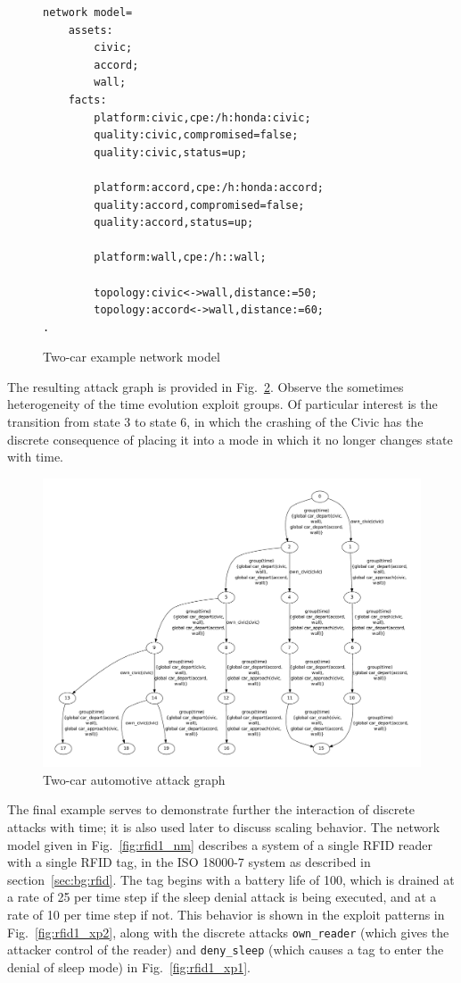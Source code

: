 \begin{figure}
\begin{lstlisting}
network model=
    assets:
        civic;
        accord;
        wall;
    facts:
        platform:civic,cpe:/h:honda:civic;
        quality:civic,compromised=false;
        quality:civic,status=up;
        
        platform:accord,cpe:/h:honda:accord;
        quality:accord,compromised=false;
        quality:accord,status=up;

        platform:wall,cpe:/h::wall;

        topology:civic<->wall,distance:=50;
        topology:accord<->wall,distance:=60;
.
\end{lstlisting}
\caption{Two-car example network model}
\label{fig:fullbunny_two_nm}
\end{figure}

The resulting attack graph is provided in Fig.~\ref{fig:fullbunny_two_ag}.
Observe the sometimes heterogeneity of the time evolution exploit groups.
Of particular interest is the transition from state 3 to state 6, in which
the crashing of the Civic has the discrete consequence of placing it into a
mode in which it no longer changes state with time.

\begin{figure}
\includegraphics[width=6in]{ag_car/twocar/full_bunny_twocar_ag_5}
\caption{Two-car automotive attack graph}
\label{fig:fullbunny_two_ag}
\end{figure}
The final example serves to demonstrate further the interaction of discrete
attacks with time; it is also used later to discuss scaling behavior. The network
model given in Fig.~\ref{fig:rfid1_nm} describes a system of a single
RFID reader with a single RFID tag, in the ISO 18000-7 system as described 
in section~\ref{sec:bg:rfid}. The tag begins with a battery life of 100, which
is drained at a rate of 25 per time step if the sleep denial attack is being
executed, and at a rate of 10 per time step if not. This behavior is shown in
the exploit patterns in Fig.~\ref{fig:rfid1_xp2}, along with
the discrete attacks \texttt{own\_reader} (which gives the attacker control of
the reader) and \texttt{deny\_sleep} (which causes a tag to enter the
denial of sleep mode) in Fig.~\ref{fig:rfid1_xp1}.

